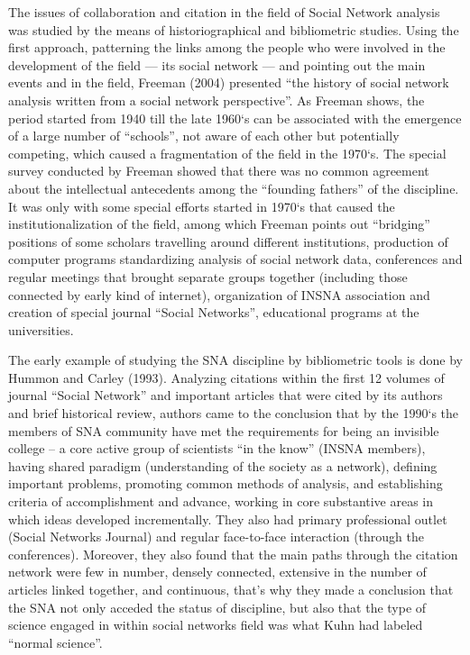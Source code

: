 \documentclass[11pt]{article} %
\begin{document}
The issues of collaboration and citation in the field of Social Network analysis was studied by the means of historiographical and bibliometric studies. 
Using the first approach, patterning the links among the people who were involved in the development of the field — its social network — and pointing out the main events and in the field, Freeman (2004) presented “the history of social network analysis written from a social network perspective”. As Freeman shows, the period started from 1940 till the late 1960`s can be associated with the emergence of a large number of “schools”, not aware of each other but potentially competing, which caused a fragmentation of the field in the 1970`s. The special survey conducted by Freeman showed that there was no common agreement about the intellectual antecedents among the “founding fathers” of the discipline. It was only with some special efforts started in 1970`s that caused the institutionalization of the field, among which Freeman points out “bridging” positions of some scholars travelling around different institutions, production of computer programs standardizing analysis of social network data, conferences and regular meetings that brought separate groups together (including those connected by early kind of internet), organization of INSNA association and creation of special journal “Social Networks”, educational programs at the universities. \medskip 

The early example of studying the SNA discipline by bibliometric tools is done by Hummon and Carley (1993). Analyzing citations within the first 12 volumes of journal “Social Network” and important articles that were cited by its authors and brief historical review, authors came to the conclusion that by the 1990`s the members of SNA community have met the requirements for being an invisible college – a core active group of scientists “in the know” (INSNA members), having shared paradigm (understanding of the society as a network), defining important problems, promoting common methods of analysis, and establishing criteria of accomplishment and advance, working in core substantive areas in which ideas developed incrementally. They also had primary professional outlet (Social Networks Journal) and regular face-to-face interaction (through the conferences). Moreover, they also found that the main paths through the citation network were few in number, densely connected, extensive in the number of articles linked together, and continuous, that’s why they made a conclusion that the SNA not only acceded the status of discipline, but also that the type of science engaged in within social networks field was what Kuhn had labeled “normal science”.\medskip 
\end{document}
